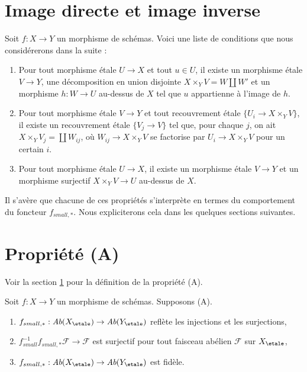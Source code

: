 \section{Image directe et image inverse}
\label{section-monomorphisms}

\noindent
Soit $f : X \to Y$ un morphisme de sch\'emas.
Voici une liste de conditions que nous consid\'ererons dans la suite :
\begin{enumerate}
\item[(A)] Pour tout morphisme \'etale $U \to X$ et tout $u \in U$, il existe
un morphisme \'etale $V \to Y$, une d\'ecomposition en union disjointe
$X \times_Y V = W \amalg W'$ et un morphisme $h : W \to U$ au-dessus de $X$
tel que $u$ appartienne \`a l'image de $h$.
\item[(B)] Pour tout morphisme \'etale $V \to Y$ et tout recouvrement \'etale
$\{U_i \to X \times_Y V\}$, il existe un recouvrement \'etale
$\{V_j \to V\}$ tel que, pour chaque $j$, on ait
$X \times_Y V_j = \coprod W_{ij}$, o\`u $W_{ij} \to X \times_Y V$
se factorise par $U_i \to X \times_Y V$ pour un certain $i$.
\item[(C)] Pour tout morphisme \'etale $U \to X$, il existe un morphisme \'etale $V \to Y$
et un morphisme surjectif $X \times_Y V \to U$ au-dessus de $X$.
\end{enumerate}
Il s'av\`ere que chacune de ces propri\'et\'es s'interpr\`ete en termes du
comportement du foncteur $f_{small, *}$. Nous expliciterons cela
dans les quelques sections suivantes.



\section{Propri\'et\'e (A)}
\label{section-A}

\noindent
Voir la section \ref{section-monomorphisms} pour la d\'efinition de la propri\'et\'e
(A).

\begin{lemma}
\label{lemma-property-A-implies}
Soit $f : X \to Y$ un morphisme de sch\'emas.
Supposons (A).
\begin{enumerate}
\item
$f_{small, *} :
\textit{Ab}(X_\etale)
\to
\textit{Ab}(Y_\etale)$
refl\`ete les injections et les surjections,
\item $f_{small}^{-1}f_{small, *}\mathcal{F} \to \mathcal{F}$
est surjectif pour tout faisceau ab\'elien $\mathcal{F}$ sur $X_\etale$,
\item
$f_{small, *} :
\textit{Ab}(X_\etale)
\to
\textit{Ab}(Y_\etale)$
est fid\`ele.
\end{enumerate}
\end{lemma}


